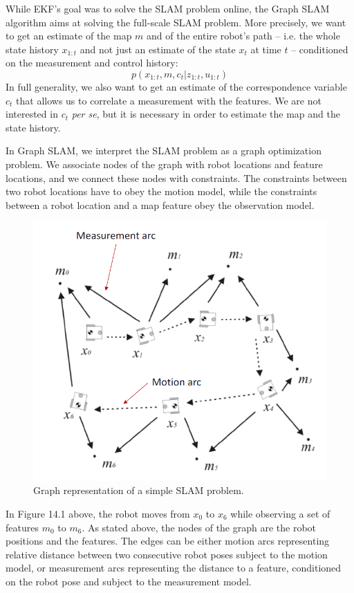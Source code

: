 \documentclass[twoside]{article}
\begin{document}
While EKF's goal was to solve the SLAM problem online, the Graph SLAM algorithm aims at solving the full-scale SLAM problem.  More precisely, we want to get an estimate of the map $m$  and of the entire robot's path -- i.e. the whole state history $x_{1:t}$ and not just an estimate of the state $x_t$ at time $t$ --  conditioned on the measurement and control history:
\begin{equation}
p(x_{1:t}, m, c_t | z_{1:t}, u_{1:t}) \nonumber
\end{equation}
In full generality, we also want to get an estimate of the correspondence variable $c_t$ that allows us to correlate a measurement with the features. We are not interested in $c_t$ \textit{per se}, but it is necessary in order to estimate the map and the state history.

In Graph SLAM, we interpret the SLAM problem as a graph optimization problem. We associate nodes of the graph with robot locations and feature locations, and we connect these nodes with constraints. The constraints between two robot locations have to obey the motion model, while the constraints between a robot location and a map feature obey the observation model.

\begin{figure}[H]
\centering
\includegraphics[scale=0.4]{graphSLAM_fig1}
\caption{Graph representation of a simple SLAM problem.}
\end{figure}

In Figure 14.1 above,  the robot moves from $x_0$ to $x_6$ while observing a set of features $m_0$ to $m_6$. As stated above, the nodes of the graph are the robot positions and the features. The edges can be either motion arcs representing relative distance between two consecutive robot poses subject to the motion model, or measurement arcs representing the distance to a feature, conditioned on the robot pose and subject to the measurement model.
\end{document}
